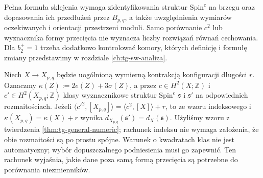 \begin{uwaga}
Pełna formuła sklejenia wymaga zidentyfikowania struktur
$\mathrm{Spin}^c$ na brzegu oraz dopasowania ich przedłużeń
przez $B_{p,q}$, a także uwzględnienia wymiarów
oczekiwanych i orientacji przestrzeni moduli. Samo
porównanie $c^2$ lub wyznacznika formy przecięcia
nie wyznacza liczby rozwiązań równań cechowania.
Dla $b_2^+=1$ trzeba dodatkowo kontrolować komory,
których definicję i formułę zmiany przedstawimy w rozdziale
\ref{ch:tg-sw-analiza}.
\end{uwaga}

\begin{przyklad}
Niech $X\to X_{p,q}$ będzie uogólnioną wymierną kontrakcją
konfiguracji długości $r$. Oznaczmy
$\kappa(Z):=2e(Z)+3\sigma(Z)$, a przez
$c\in H^2(X;\mathbb Z)$ i $c'\in H^2(X_{p,q};\mathbb Z)$
klasy wyznacznikowe struktur $\mathrm{Spin}^c$
$\mathfrak s$ i $\mathfrak s'$ na odpowiednich
rozmaitościach. Jeżeli
$\langle c'^2,[X_{p,q}]\rangle
=\langle c^2,[X]\rangle+r$, to ze wzoru indeksowego i
$\kappa(X_{p,q})=\kappa(X)+r$ wynika
$d_{X_{p,q}}(\mathfrak s')=d_X(\mathfrak s)$.
Użyliśmy wzoru z twierdzenia
\ref{thm:tg-general-numeric}; rachunek indeksu
nie wymaga założenia, że obie rozmaitości
są po prostu spójne.
Warunek o kwadratach klas nie jest automatyczny;
wybór dopuszczalnego podniesienia musi go zapewnić.
Ten rachunek wyjaśnia, jakie dane poza samą formą
przecięcia są potrzebne do porównania niezmienników.
\end{przyklad}

